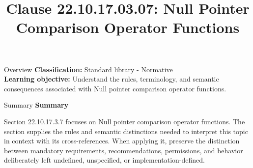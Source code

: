 \documentclass[10pt,letterpaper]{article}
\title{Clause 22.10.17.03.07: Null Pointer Comparison Operator Functions}
\author{}
\date{}
\begin{document}
\maketitle
\begin{CornellOverviewBox}{Overview}
\textbf{Classification:} Standard library - Normative\\[2pt]
\textbf{Learning objective:} Understand the rules, terminology, and semantic consequences associated with Null pointer comparison operator functions.
\end{CornellOverviewBox}\begin{CornellSummaryBox}{Summary}
{\sffamily\bfseries\color{Accent} Summary}\par\vspace{3pt}Section 22.10.17.3.7 focuses on Null pointer comparison operator functions. The section supplies the rules and semantic distinctions needed to interpret this topic in context with its cross-references. When applying it, preserve the distinction between mandatory requirements, recommendations, permissions, and behavior deliberately left undefined, unspecified, or implementation-defined.
\end{CornellSummaryBox}
\end{document}
